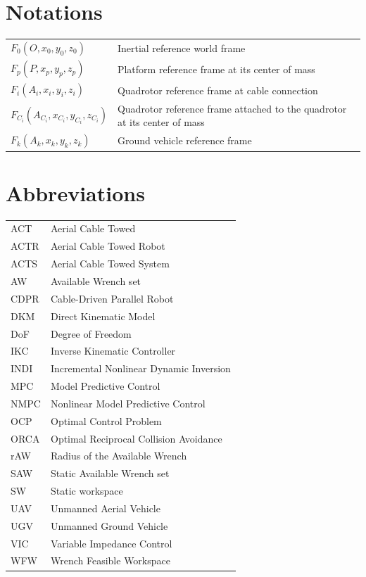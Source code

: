 \section*{Notations}
\begin{tabular}{l l}
$F_0(O, x_0, y_0, z_0)$ & Inertial reference world frame \\
$F_p(P, x_p, y_p, z_p)$ & Platform reference frame at its center of mass \\
$F_i(A_i, x_i, y_i, z_i)$ & Quadrotor reference frame at cable connection \\
$F_{C_i}(A_{C_i}, x_{C_i}, y_{C_i}, z_{C_i})$ & Quadrotor reference frame attached to the quadrotor at its center of mass \\
$F_k(A_k, x_k, y_k, z_k)$ & Ground vehicle reference frame \\
\end{tabular}

 \newpage
 
\section*{Abbreviations}

\begin{tabular}{l l}
   ACT  & Aerial Cable Towed \\
   ACTR & Aerial Cable Towed Robot \\
   ACTS & Aerial Cable Towed System \\
   AW   & Available Wrench set \\
   CDPR & Cable-Driven Parallel Robot \\
   DKM  & Direct Kinematic Model \\
   DoF  & Degree of Freedom \\
   IKC  & Inverse Kinematic Controller \\
   INDI & Incremental Nonlinear Dynamic Inversion \\
   MPC  & Model Predictive Control \\
   NMPC & Nonlinear Model Predictive Control \\
   OCP  & Optimal Control Problem \\
   ORCA & Optimal Reciprocal Collision Avoidance \\
   rAW  & Radius of the Available Wrench \\
   SAW  & Static Available Wrench set \\
   SW   & Static workspace \\
   UAV  & Unmanned Aerial Vehicle \\
   UGV  & Unmanned Ground Vehicle \\
   VIC  & Variable Impedance Control \\
   WFW  & Wrench Feasible Workspace \\
\end{tabular}


